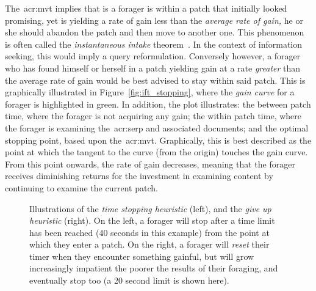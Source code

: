 The~\gls{acr:mvt} implies that is a forager is within a patch that initially looked promising, yet is yielding a rate of gain less than the \emph{average rate of gain,} he or she should abandon the patch and then move to another one. This phenomenon is often called the \emph{instantaneous intake} theorem~\citep{stephens1986foraging_theory}. In the context of information seeking, this would imply a query reformulation. Conversely however, a forager who has found himself or herself in a patch yielding gain at a rate \emph{greater} than the average rate of gain would be best advised to stay within said patch. This is graphically illustrated in Figure~\ref{fig:ift_stopping}, where the \emph{gain curve} for a forager is highlighted in {\color{dmax_green}green.} In addition, the plot illustrates:  the between patch time, where the forager is not acquiring any gain;  the within patch time, where the forager is examining the~\gls{acr:serp} and associated documents; and  the optimal stopping point, based upon the~\gls{acr:mvt}. Graphically, this is best described as the point at which the tangent to the curve (from the origin) touches the gain curve. From this point onwards, the rate of gain decreases, meaning that the forager receives diminishing returns for the investment in examining content by continuing to examine the current patch.

\begin{figure}[t!]
    \centering
    \caption[Time-based stopping heuristics]{Illustrations of the \emph{time stopping heuristic} (left), and the \emph{give up heuristic} (right). On the left, a forager will stop after a time limit has been reached (40 seconds in this example) from the point at which they enter a patch. On the right, a forager will \emph{reset} their timer when they encounter something gainful, but will grow increasingly impatient the poorer the results of their foraging, and eventually stop too (a 20 second limit is shown here).}
    \label{fig:gut}
\end{figure}

